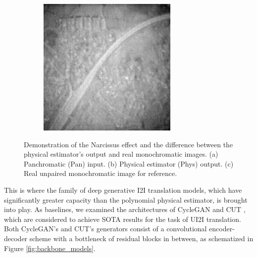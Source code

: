 \begin{figure}
\begin{subfigure}[b]{0.15\textwidth}
      \label{fig:phys_in}
  \end{subfigure}
  \hfill
  \begin{subfigure}[b]{0.15\textwidth}
      \centering
      \includegraphics[width=\textwidth]{../figs/outputs/mono/508.png}
      \label{fig:real_our}
  \end{subfigure}
  \hfill

  \caption{Demonstration of the Narcissus effect and the difference between the physical estimator's output and real monochromatic images. (a) Panchromatic (Pan) input. (b) Physical estimator (Phys) output. (c) Real unpaired monochromatic image for reference.}
  \label{fig:phys_est_gap}

\end{figure}

This is where the family of deep generative I2I translation models, which have significantly greater capacity than the polynomial physical estimator, is brought into play.
As baselines, we examined the architectures of CycleGAN \cite{CycleGAN2017} and CUT \cite{park2020cut}, which are considered to achieve SOTA results for the task of UI2I translation.
Both CycleGAN's and CUT's generators consist of a convolutional encoder-decoder scheme with a bottleneck of residual blocks \cite{He2016DeepRL} in between, as schematized in Figure \ref{fig:backbone_models}.

